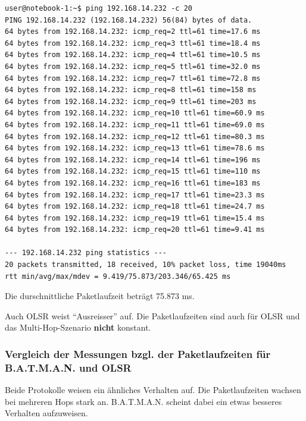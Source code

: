 \documentclass[a4paper,10pt]{article}
\begin{document}
\begin{lstlisting}
user@notebook-1:~$ ping 192.168.14.232 -c 20
PING 192.168.14.232 (192.168.14.232) 56(84) bytes of data.
64 bytes from 192.168.14.232: icmp_req=2 ttl=61 time=17.6 ms
64 bytes from 192.168.14.232: icmp_req=3 ttl=61 time=18.4 ms
64 bytes from 192.168.14.232: icmp_req=4 ttl=61 time=10.5 ms
64 bytes from 192.168.14.232: icmp_req=5 ttl=61 time=32.0 ms
64 bytes from 192.168.14.232: icmp_req=7 ttl=61 time=72.8 ms
64 bytes from 192.168.14.232: icmp_req=8 ttl=61 time=158 ms
64 bytes from 192.168.14.232: icmp_req=9 ttl=61 time=203 ms
64 bytes from 192.168.14.232: icmp_req=10 ttl=61 time=60.9 ms
64 bytes from 192.168.14.232: icmp_req=11 ttl=61 time=69.0 ms
64 bytes from 192.168.14.232: icmp_req=12 ttl=61 time=80.3 ms
64 bytes from 192.168.14.232: icmp_req=13 ttl=61 time=78.6 ms
64 bytes from 192.168.14.232: icmp_req=14 ttl=61 time=196 ms
64 bytes from 192.168.14.232: icmp_req=15 ttl=61 time=110 ms
64 bytes from 192.168.14.232: icmp_req=16 ttl=61 time=183 ms
64 bytes from 192.168.14.232: icmp_req=17 ttl=61 time=23.3 ms
64 bytes from 192.168.14.232: icmp_req=18 ttl=61 time=24.7 ms
64 bytes from 192.168.14.232: icmp_req=19 ttl=61 time=15.4 ms
64 bytes from 192.168.14.232: icmp_req=20 ttl=61 time=9.41 ms

--- 192.168.14.232 ping statistics --- 
20 packets transmitted, 18 received, 10% packet loss, time 19040ms
rtt min/avg/max/mdev = 9.419/75.873/203.346/65.425 ms
\end{lstlisting}

Die durschnittliche Paketlaufzeit beträgt 75.873 ms.

Auch OLSR weist "`Ausreisser"' auf.
Die Paketlaufzeiten sind auch für OLSR und das Multi-Hop-Szenario \textbf{nicht} konstant.

\subsubsection{Vergleich der Messungen bzgl. der Paketlaufzeiten für B.A.T.M.A.N. und OLSR}

Beide Protokolle weisen ein ähnliches Verhalten auf.
Die Paketlaufzeiten wachsen bei mehreren Hops stark an.
B.A.T.M.A.N. scheint dabei ein etwas besseres Verhalten aufzuweisen.

%
%
%
%
%
%
%
%
%
%
%
\end{document}
